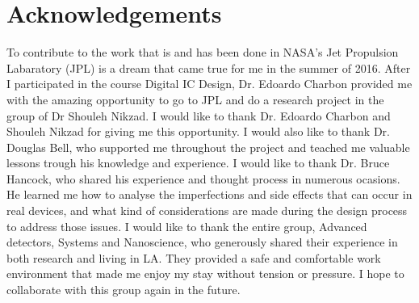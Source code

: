 \section{Acknowledgements}\label{sec:acknowledgements}
To contribute to the work that is and has been done in NASA's Jet Propulsion Labaratory (JPL) is a dream that came true for me in the summer of 2016. After I participated in the course Digital IC Design, Dr. Edoardo Charbon provided me with the amazing opportunity to go to JPL and do a research project in the group of Dr Shouleh Nikzad. I would like to thank Dr. Edoardo Charbon and Shouleh Nikzad for giving me this opportunity. I would also like to thank Dr. Douglas Bell, who supported me throughout the project and teached me valuable lessons trough his knowledge and experience. I would like to thank Dr. Bruce Hancock, who shared his experience and thought process in numerous ocasions. He learned me how to analyse the imperfections and side effects that can occur in real devices, and what kind of considerations are made during the design process to address those issues. I would like to thank the entire group, Advanced detectors, Systems and Nanoscience, who generously shared their experience in both research and living in LA. They provided a safe and comfortable work environment that made me enjoy my stay without tension or pressure. I hope to collaborate with this group again in the future.
